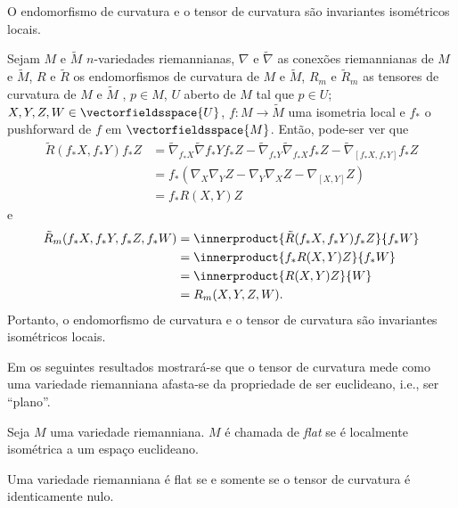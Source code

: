 \begin{teorema}
	O endomorfismo de curvatura e o tensor de curvatura são invariantes isométricos locais.
\end{teorema}

\begin{demonstracao}
	Sejam $M$ e $\tilde{M}$ $n$-variedades riemannianas,
	$\nabla$ e $\tilde{\nabla}$ as conexões riemannianas de $M$ e $\tilde{M}$,
	$R$ e $\tilde{R}$ os endomorfismos de curvatura de $M$ e $\tilde{M}$,
	$R_m$ e $\tilde{R}_m$ as tensores de curvatura de $M$ e $\tilde{M}$ ,
	$p \in M$,
	$U$ aberto de $M$ tal que $p \in U$;
	$X,Y,Z,W \in \vectorfieldsspace{U}$,
	$f: M \rightarrow \tilde{M}$ uma isometria local e
	$f_*$ o pushforward de $f$ em $\vectorfieldsspace{M}$.
	Então, pode-ser ver que
	\begin{align*}
		\tilde{R}(f_*X, f_*Y)f_*Z &= \tilde{\nabla}_{f_*X} \tilde{\nabla} f_*Y f_*Z - \tilde{\nabla}_{f_*Y} \tilde{\nabla}_{f_*X} f_*Z - \tilde{\nabla}_{[f_*X, f_*Y]} f_*Z\\
		&= f_* \left(\nabla_X \nabla_Y Z - \nabla_Y \nabla_X Z - \nabla_{[X,Y]}Z\right)\\
		&= f_* R(X,Y)Z
	\end{align*}
	e
	\begin{align*}
		\tilde{R}_m(f_*X, f_*Y, f_*Z, f_*W)
		&= \innerproduct{\tilde{R}(f_*X, f_*Y)f_*Z}{f_*W}\\
		&= \innerproduct{f_* R(X,Y)Z}{f_*W}\\
		&= \innerproduct{R(X,Y)Z}{W}\\
		&= R_m(X,Y,Z,W).
	\end{align*}
	Portanto, o endomorfismo de curvatura e o tensor de curvatura são invariantes isométricos locais.
\end{demonstracao}


Em os seguintes resultados mostrará-se que o tensor de curvatura mede como uma variedade riemanniana afasta-se da propriedade de ser euclideano, i.e., ser ``plano''.

\begin{definicao}
	Seja $M$ uma variedade riemanniana.
	$M$ é chamada de \emph{flat} se é localmente isométrica a um espaço euclideano.
\end{definicao}

\begin{teorema}
	Uma variedade riemanniana é flat se e somente se o tensor de curvatura é identicamente nulo.
\end{teorema}

